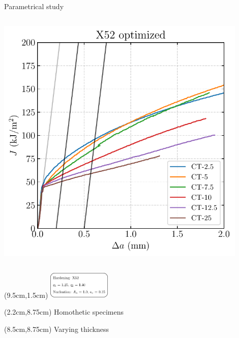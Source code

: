 \documentclass[9pt]{beamer}
\begin{document}
\begin{frame}{Parametrical study}
\begin{columns}
        \centering
        \includegraphics[width=0.9\textwidth]{Images/plot_12_5_Jda_1_2__1_4.pdf}
    \end{columns}

    \begin{textblock*}{3cm}(9.5cm,1.5cm) %
        \includegraphics[width=3cm]{Images/coeffs_X52.pdf}
    \end{textblock*}

    \begin{textblock*}{5cm}(2.2cm,8.75cm)
        \small Homothetic specimens
    \end{textblock*}

    \begin{textblock*}{5cm}(8.5cm,8.75cm)
        \small Varying thickness
    \end{textblock*}

\end{frame}

\end{document}
